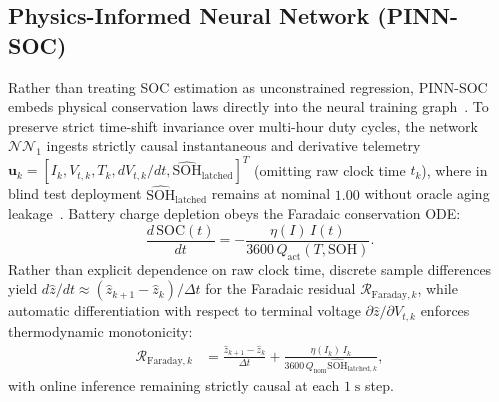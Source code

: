 \documentclass[11pt,a4paper]{article}
\begin{document}
\subsection{Physics-Informed Neural Network (PINN-SOC)}
Rather than treating SOC estimation as unconstrained regression, PINN-SOC embeds physical conservation laws directly into the neural training graph~\cite{Raissi2019pinn,Brancato2026}. To preserve strict time-shift invariance over multi-hour duty cycles, the network $\mathcal{NN}_1$ ingests strictly causal instantaneous and derivative telemetry $\mathbf{u}_k = [I_k, V_{t,k}, T_k, dV_{t,k}/dt, \hat{\text{SOH}}_{\text{latched}}]^T$ (omitting raw clock time $t_k$), where in blind test deployment $\hat{\text{SOH}}_{\text{latched}}$ remains at nominal $1.00$ without oracle aging leakage~\cite{Le2026charging}. Battery charge depletion obeys the Faradaic conservation ODE:
\begin{equation}\label{eqn:pinn_ode}
\frac{d\,\text{SOC}(t)}{dt} = -\frac{\eta(I)\, I(t)}{3600\,Q_{\text{act}}(T, \text{SOH})}.
\end{equation}
Rather than explicit dependence on raw clock time, discrete sample differences yield $d\hat{z}/dt \approx (\hat{z}_{k+1} - \hat{z}_k)/\Delta t$ for the Faradaic residual $\mathcal{R}_{\text{Faraday},k}$, while automatic differentiation with respect to terminal voltage $\partial \hat{z}/\partial V_{t,k}$ enforces thermodynamic monotonicity:
\begin{align}
\mathcal{R}_{\text{Faraday},k} &= \frac{\hat{z}_{k+1} - \hat{z}_k}{\Delta t} + \frac{\eta(I_k)\, I_k}{3600\,Q_{\text{nom}} \hat{\text{SOH}}_{\text{latched},k}}, \label{eqn:res_faraday}
\end{align}
with online inference remaining strictly causal at each $1\;\mathrm{s}$ step.
\end{document}
